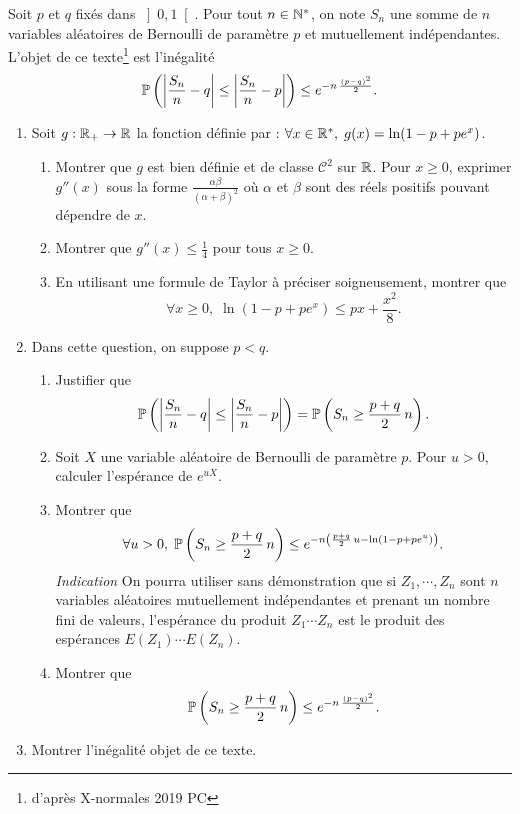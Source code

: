 Soit $p$ et $q$ fixés dans $\left] 0,1\right[$. Pour tout $n\in \mathbb{N}^*$, on note $S_n$ une somme de $n$ variables aléatoires de Bernoulli de paramètre $p$ et mutuellement indépendantes. L'objet de ce texte\footnote{d'après X-normales 2019 PC} est l'inégalité
\[
 \mathbb{P}\left( \left|\frac{S_n}{n}-q\right| \leq \left|\frac{S_n}{n}-p\right|\right)
 \leq
 e^{-n\,\frac{(p-q)^2}{2}}.
\]
\begin{enumerate}
 \item Soit $g: \mathbb{R}_+ \rightarrow \mathbb{R}$ la fonction définie par : $\forall x \in \mathbb{R}^*, \; g(x) = \ln(1-p+pe^x)$.
 \begin{enumerate}
  \item Montrer que $g$ est bien définie et de classe $\mathcal{C}^2$ sur $\mathbb{R}$. Pour $x\geq 0$, exprimer $g''(x)$ sous la forme $\frac{\alpha \beta}{(\alpha + \beta)^2}$ où $\alpha$ et $\beta$ sont des réels positifs pouvant dépendre de $x$.  
  \item Montrer que $g''(x) \leq \frac{1}{4}$ pour tous $x\geq 0$.
  \item En utilisant une formule de Taylor à préciser soigneusement, montrer que
\[
 \forall x\geq 0, \; \ln(1-p+pe^x) \leq px + \frac{x^2}{8}.
\]
 \end{enumerate}

 \item Dans cette question, on suppose $p < q$.
 \begin{enumerate}
  \item Justifier que 
\[
 \mathbb{P}\left( \left|\frac{S_n}{n}-q\right| \leq \left|\frac{S_n}{n}-p\right|\right)
 = \mathbb{P}\left( S_n \geq \frac{p+q}{2}\, n\right). 
\]
  \item Soit $X$ une variable aléatoire de Bernoulli de paramètre $p$. Pour $u>0$, calculer l'espérance de $e^{u X}$.
  \item Montrer que
\[
 \forall u > 0, \; 
 \mathbb{P}\left( S_n \geq \frac{p+q}{2}\, n\right) \leq e^{-n\left( \frac{p+q}{2}\, u - \ln(1-p+pe^u)\right) }.
\]
\emph{Indication} On pourra utiliser sans démonstration que si $Z_1, \cdots, Z_n$ sont $n$ variables aléatoires mutuellement indépendantes et prenant un nombre fini de valeurs, l'espérance du produit $Z_1 \cdots Z_n$ est le produit des espérances $E(Z_1) \cdots E(Z_n)$.
  \item Montrer que 
\[
 \mathbb{P}\left( S_n \geq \frac{p+q}{2}\, n\right) \leq e^{-n\,\frac{(p-q)^2}{2}}.
\]
 \end{enumerate}

 \item Montrer l'inégalité objet de ce texte.

\end{enumerate}
